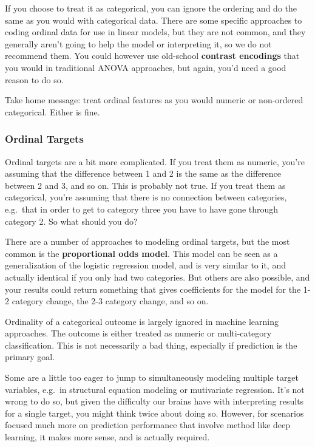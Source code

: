 \documentclass[
  letterpaper,
]{krantz}
\begin{document}
If you choose to treat it as categorical, you can ignore the ordering
and do the same as you would with categorical data. There are some
specific approaches to coding ordinal data for use in linear models, but
they are not common, and they generally aren't going to help the model
or interpreting it, so we do not recommend them. You could however use
old-school \textbf{contrast encodings} that you would in traditional
ANOVA approaches, but again, you'd need a good reason to do so.

Take home message: treat ordinal features as you would numeric or
non-ordered categorical. Either is fine.

\subsubsection{Ordinal Targets}\label{ordinal-targets}

Ordinal targets are a bit more complicated. If you treat them as
numeric, you're assuming that the difference between 1 and 2 is the same
as the difference between 2 and 3, and so on. This is probably not true.
If you treat them as categorical, you're assuming that there is no
connection between categories, e.g.~that in order to get to category
three you have to have gone through category 2. So what should you do?

There are a number of approaches to modeling ordinal targets, but the
most common is the \textbf{proportional odds model}. This model can be
seen as a generalization of the logistic regression model, and is very
similar to it, and actually identical if you only had two categories.
But others are also possible, and your results could return something
that gives coefficients for the model for the 1-2 category change, the
2-3 category change, and so on.

Ordinality of a categorical outcome is largely ignored in machine
learning approaches. The outcome is either treated as numeric or
multi-category classification. This is not necessarily a bad thing,
especially if prediction is the primary goal.

\begin{tcolorbox}[enhanced jigsaw, bottomrule=.15mm, rightrule=.15mm, colframe=quarto-callout-tip-color-frame, colback=white, breakable, arc=.35mm, left=2mm, opacityback=0, leftrule=.75mm, toprule=.15mm]

Some are a little too eager to jump to simultaneously modeling multiple
target variables, e.g.~in structural equation modeling or mutivariate
regression. It's not wrong to do so, but given the difficulty our brains
have with interpreting results for a single target, you might think
twice about doing so. However, for scenarios focused much more on
prediction performance that involve method like deep learning, it makes
more sense, and is actually required.

\end{tcolorbox}
\end{document}
